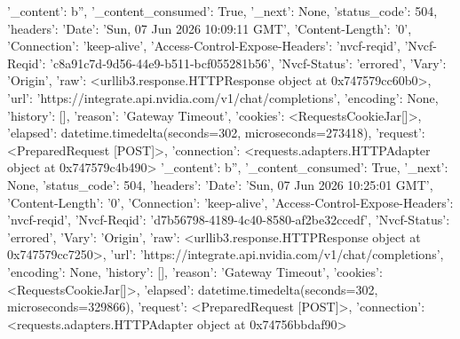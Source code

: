 
{'_content': b'', '_content_consumed': True, '_next': None, 'status_code': 504, 'headers': {'Date': 'Sun, 07 Jun 2026 10:09:11 GMT', 'Content-Length': '0', 'Connection': 'keep-alive', 'Access-Control-Expose-Headers': 'nvcf-reqid', 'Nvcf-Reqid': 'c8a91c7d-9d56-44e9-b511-bcf055281b56', 'Nvcf-Status': 'errored', 'Vary': 'Origin'}, 'raw': <urllib3.response.HTTPResponse object at 0x747579cc60b0>, 'url': 'https://integrate.api.nvidia.com/v1/chat/completions', 'encoding': None, 'history': [], 'reason': 'Gateway Timeout', 'cookies': <RequestsCookieJar[]>, 'elapsed': datetime.timedelta(seconds=302, microseconds=273418), 'request': <PreparedRequest [POST]>, 'connection': <requests.adapters.HTTPAdapter object at 0x747579c4b490>}
{'_content': b'', '_content_consumed': True, '_next': None, 'status_code': 504, 'headers': {'Date': 'Sun, 07 Jun 2026 10:25:01 GMT', 'Content-Length': '0', 'Connection': 'keep-alive', 'Access-Control-Expose-Headers': 'nvcf-reqid', 'Nvcf-Reqid': 'd7b56798-4189-4c40-8580-af2be32ccedf', 'Nvcf-Status': 'errored', 'Vary': 'Origin'}, 'raw': <urllib3.response.HTTPResponse object at 0x747579cc7250>, 'url': 'https://integrate.api.nvidia.com/v1/chat/completions', 'encoding': None, 'history': [], 'reason': 'Gateway Timeout', 'cookies': <RequestsCookieJar[]>, 'elapsed': datetime.timedelta(seconds=302, microseconds=329866), 'request': <PreparedRequest [POST]>, 'connection': <requests.adapters.HTTPAdapter object at 0x74756bbdaf90>}
